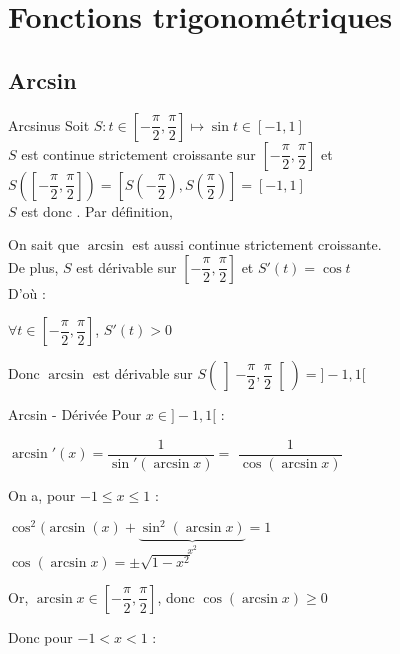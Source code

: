 \documentclass[12pt,a4paper]{report}
\begin{document}
\chapter{Fonctions trigonométriques}

\section{Arcsin}
\begin{definition}{Arcsinus}{}
Soit $S : t\in \left[-\dfrac{\pi}{2}, \dfrac{\pi}{2}\right] \mapsto \sin t \in [-1,1]$\\
$S$ est continue strictement croissante sur $\left[-\dfrac{\pi}{2}, \dfrac{\pi}{2}\right]$ et $S\left(\left[-\dfrac{\pi}{2}, \dfrac{\pi}{2}\right]\right) = \left[ S\left(-\dfrac{\pi}{2}\right),S\left(\dfrac{\pi}{2}\right)\right] = [-1,1]$\\
$S$ est donc . Par définition, 
\end{definition}

\begin{remarque}[Dérivabilité]
On sait que $\arcsin$ est aussi continue strictement croissante. \\
De plus, $S$ est dérivable sur $\left[-\dfrac{\pi}{2}, \dfrac{\pi}{2}\right]$ et $S'(t)= \cos t$\\
D'où : 
\begin{center}
    $\forall t \in \left[-\dfrac{\pi}{2}, \dfrac{\pi}{2}\right]$, $S'(t) > 0$
\end{center}
Donc $\arcsin$ est dérivable sur $S\left(\left]-\dfrac{\pi}{2}, \dfrac{\pi}{2}\right[\right) = ]-1,1[$
\end{remarque}

\begin{propositions}{Arcsin - Dérivée}{}
Pour $x\in ]-1,1[$ : 
\begin{center}
    $\arcsin'(x) = \dfrac{1}{\sin'(\arcsin x)} = $ $\dfrac{1}{\cos(\arcsin x)}$
\end{center}
On a, pour $-1 \leq x \leq 1$ : 
\begin{center}
    $\cos^2(\arcsin(x)+\underbrace{\sin^2(\arcsin x)}_{x^2}=1$\\
    $\cos (\arcsin x) = \pm \sqrt{1-x^2}$
\end{center}
Or, $\arcsin x \in \left[-\dfrac{\pi}{2}, \dfrac{\pi}{2}\right]$, donc $\cos (\arcsin x)\geq 0$
\begin{center}
\end{center}
Donc pour $-1<x<1$ : 
\end{propositions}
\end{document}
